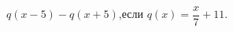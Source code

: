 \begin{ex}[type=calculate_expression]
	\begin{condition}
		\( q(x-5)-q(x+5) \),\quad если \( q(x)=\dfrac{x}{7}+11 \).
	\end{condition}
\end{ex}